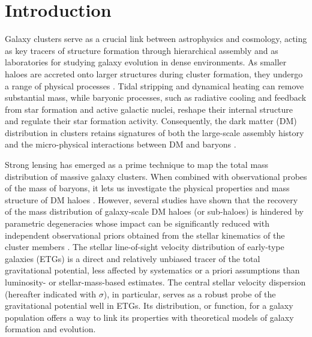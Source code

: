 \documentclass{aa}
\begin{document}
   \maketitle


\section{Introduction}\label{s1}

Galaxy clusters serve as a crucial link between astrophysics and cosmology, acting as key tracers of structure formation through hierarchical assembly and as laboratories for studying galaxy evolution in dense environments. As smaller haloes are accreted onto larger structures during cluster formation, they undergo a range of physical processes \citep[][]{kravtsov12}. Tidal stripping and dynamical heating can remove substantial mass, while baryonic processes, such as radiative cooling and feedback from star formation and active galactic nuclei, reshape their internal structure and regulate their star formation activity. Consequently, the dark matter (DM) distribution in clusters retains signatures of both the large-scale assembly history and the micro-physical interactions between DM and baryons \citep{giocoli08,giocoli10}. 

Strong lensing has emerged as a prime technique to map the total mass distribution of massive galaxy clusters. When combined with observational probes of the mass of baryons, it lets us investigate the physical properties and mass structure of DM haloes \citep[e.g.][]{natarajan97,caminha19,granata22,granata23}. However, several studies have shown that the recovery of the mass distribution of galaxy-scale DM haloes (or sub-haloes) is hindered by parametric degeneracies whose impact can be significantly reduced with independent observational priors obtained from the stellar kinematics of the cluster members \citep[][]{bergamini19,granata22}. The stellar line-of-sight velocity distribution of early-type galaxies (ETGs) is a direct and relatively unbiased tracer of the total gravitational potential, less affected by systematics or a priori assumptions than luminosity- or stellar-mass-based estimates. The central stellar velocity dispersion (hereafter indicated with $\sigma$), in particular, serves as a robust probe of the gravitational potential well in ETGs. Its distribution, or function, for a galaxy population offers a way to link its properties with theoretical models of galaxy formation and evolution.
\end{document}
